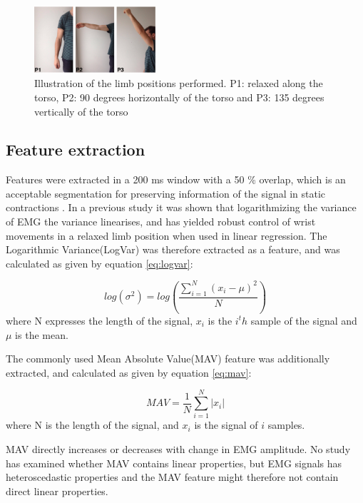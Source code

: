 \begin{figure}[thpb]
	\centering
	\includegraphics[width=0.4\textwidth]{Figures/limb_pos}  %
	\caption{Illustration of the limb positions performed. P1: relaxed along the torso, P2: 90 degrees horizontally of the torso and P3: 135 degrees vertically of the torso}
	\label{fig:limbpositions}  %
\end{figure}

\subsection{Feature extraction}
Features were extracted in a 200 ms window with a 50 \% overlap, which is an acceptable segmentation for preserving information of the signal in static contractions \cite{Farfan2010}.
In a previous study \cite{hahne2014} it was shown that logarithmizing the variance of EMG the variance linearises, and has yielded robust control of wrist movements in a relaxed limb position when used in linear regression. The Logarithmic Variance(LogVar) was therefore extracted as a feature, and was calculated as given by equation \ref{eq:logvar}:

\begin{equation} \label{eq:logvar}
log(\sigma^2) = log(\frac{\sum\limits_{i=1}^N(x_i - \mu)^2}{N})
\end{equation}
where N expresses the length of the signal, $x_i$ is the $i^th$ sample of the signal and $\mu$ is the mean. 

The commonly used Mean Absolute Value(MAV) feature was additionally extracted, and calculated as given by equation \ref{eq:mav}:

\begin{equation} \label{eq:mav}
MAV = \frac{1}{N}\sum\limits_{i=1}^N|x_i|
\end{equation}
where N is the length of the signal, and $x_i$ is the signal of $i$ samples.

MAV directly increases or decreases with change in EMG amplitude. No study has examined whether MAV contains linear properties, but EMG signals has heteroscedastic properties \cite{rasool2012} and the MAV feature might therefore not contain direct linear properties.

